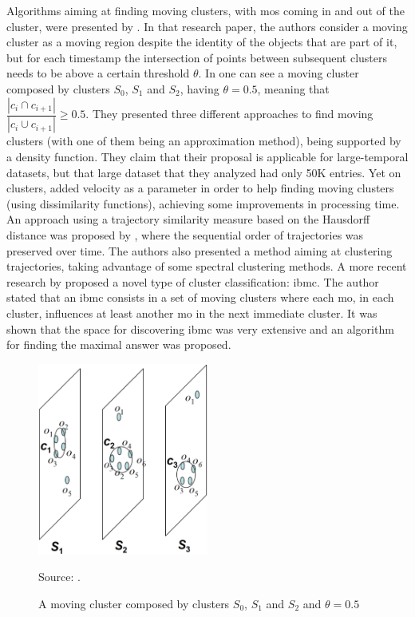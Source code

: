 Algorithms aiming at finding moving clusters, with \acp{mo} coming in and out of the cluster, were presented by
. In that research paper, the authors consider a moving cluster as a moving region despite
the identity of the objects that are part of it, but for each timestamp the intersection of points between subsequent
clusters needs to be above a certain threshold $\theta$. In  one can see a moving cluster composed
by clusters $S_0$, $S_1$ and $S_2$, having $\theta=0.5$, meaning that $\dfrac{|c_i \cap c_{i+1}|}{|c_i \cup c_{i+1}|}
\geq 0.5$. They presented three different approaches to find moving clusters (with one of them being an approximation
method), being supported by a density function. They claim that their proposal is applicable for large-temporal
datasets, but that large dataset that they analyzed had only 50K entries. Yet on clusters,  added
velocity as a parameter in order to help finding moving clusters (using dissimilarity functions), achieving some
improvements in processing time. An approach using a trajectory similarity measure based on the Hausdorff distance was
proposed by , where the sequential order of trajectories was preserved over time. The authors also
presented a method aiming at clustering trajectories, taking advantage of some spectral clustering methods. A more
recent research by  proposed a novel type of cluster classification: \ac{ibmc}. The author stated
that an \ac{ibmc} consists in a set of moving clusters where each \ac{mo}, in each cluster, influences at least another
\ac{mo} in the next immediate cluster. It was shown that the space for discovering \ac{ibmc} was very extensive and an
algorithm for finding the maximal answer was proposed.

\begin{figure}
    \centering
    \caption{A moving cluster composed by clusters $S_0$, $S_1$ and $S_2$ and $\theta=0.5$}
    \centerline{\includegraphics[width=0.5\textwidth]{images/clusters.eps}}
    \footnotesize{Source: \cite{movingclusters}.}
    \label{fig:clusters}
\end{figure}

